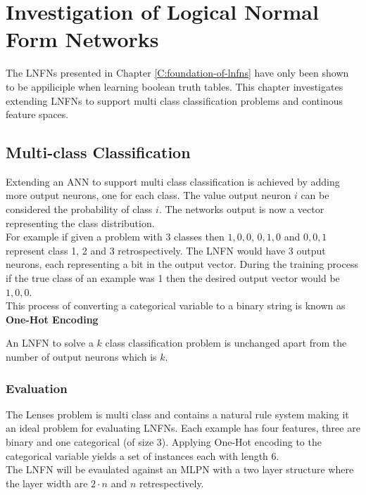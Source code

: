 \chapter{Investigation of Logical Normal Form Networks} \label{C:investigation-of-lnfns}
The LNFNs presented in Chapter \ref{C:foundation-of-lnfns} have only been shown to be appiliciple when learning boolean truth tables. This chapter investigates extending LNFNs to support multi class classification problems and continous feature spaces.

\section{Multi-class Classification}
Extending an ANN to support multi class classification is achieved by adding more output neurons, one for each class. The value output neuron $i$ can be considered the probability of class $i$. The networks output is now a vector representing the class distribution. \\

For example if given a problem with 3 classes then ${1,0,0}$, ${0,1,0}$ and ${0,0,1}$ represent class 1, 2 and 3 retrospectively. The LNFN would have 3 output neurons, each representing a bit in the output vector. During the training process if the true class of an example was 1 then the desired output vector would be ${1,0,0}$.\\

This process of converting a categorical variable to a binary string is known as \textbf{One-Hot Encoding}

\begin{definition}
	An LNFN to solve a $k$ class classification problem is unchanged apart from the number of output neurons which is $k$.
\end{definition}

\subsection{Evaluation}
The Lenses problem \cite{Lichman:2013} is multi class and contains a natural rule system making it an ideal problem for evaluating LNFNs. Each example has four features, three are binary and one categorical (of size 3). Applying One-Hot encoding to the categorical variable yields a set of instances each with length 6.\\

The LNFN will be evaulated against an MLPN with a two layer structure where the layer width are $2 \cdot n$ and $n$ retrespectively.\\

